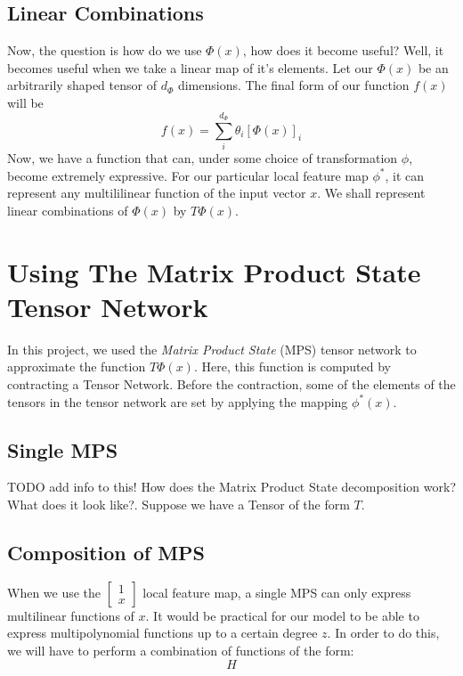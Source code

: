 \documentclass[11pt]{article}
\theoremstyle{definition}
\theoremstyle{definition}
\begin{document}
\subsection{Linear Combinations}
Now, the question is how do we use $\Phi(x)$, how does it become useful? 
Well, it becomes useful when we take a linear map of it's elements. Let our $\Phi(x)$ be an 
arbitrarily shaped tensor of $d_{\Phi}$ dimensions. The final form of our 
function $f(x)$ will be
\begin{equation}
    f(x) = \sum_{i}^{d_{\Phi}} \theta_i [\Phi(x)]_i
\end{equation}
Now, we have a function that can, under some choice of transformation
$\phi$, become extremely expressive. For our particular local feature map 
$\phi^*$, it can represent any multililinear function  of the input vector $x$. 
We shall represent linear combinations of $\Phi(x)$ by $T\Phi(x)$.

\section{Using The Matrix Product State Tensor Network}
In this project, we used the {\it Matrix Product State} (MPS) tensor network to 
approximate the function $T  \Phi(x)$. Here, this function is computed by contracting 
a Tensor Network. Before the contraction, some of the elements of the tensors in the 
tensor network are set by applying the mapping $\phi^*(x)$.

\subsection{Single MPS}
TODO add info to this!
How does the Matrix Product State decomposition work? What does it look like?.
Suppose we have a Tensor of the form $T$.

\subsection{Composition of MPS}
When we use the $ \begin{bmatrix} 1 \\ x \end{bmatrix} $ local feature map, a single
MPS can only express multilinear functions of $x$. It would be practical 
for our model to be able to express multipolynomial functions up to a certain degree $z$.
In order to do this, we will have to perform a combination of functions of the form:
\begin{equation}
    H 
\end{equation}
\end{document}
